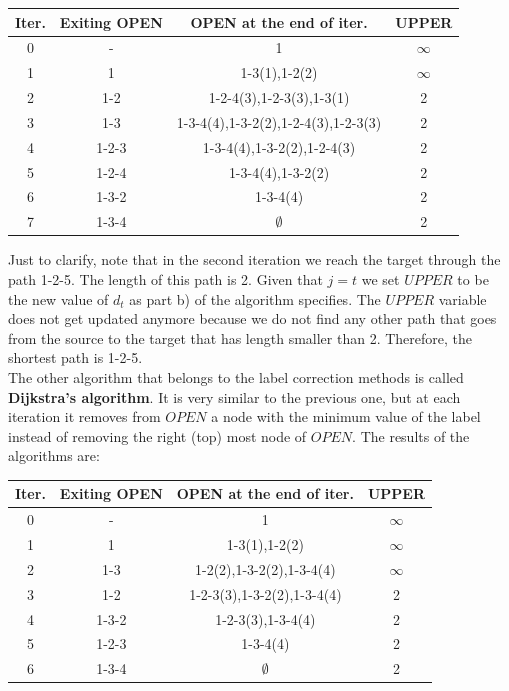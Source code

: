 \documentclass[11pt, oneside]{article}   	%
\begin{document}
\begin{center}
\begin{tabular}{ | c | c | c | c | }
 Iter. & Exiting OPEN & OPEN at the end of iter. & UPPER\\
 \hline
 0 & - & 1 & $\infty$\\
 1 & 1 & 1-3(1),1-2(2) & $\infty$\\
 2 & 1-2 & 1-2-4(3),1-2-3(3),1-3(1) & 2\\
 3 & 1-3 & 1-3-4(4),1-3-2(2),1-2-4(3),1-2-3(3) & 2\\
 4 & 1-2-3 & 1-3-4(4),1-3-2(2),1-2-4(3) & 2\\
 5 & 1-2-4 & 1-3-4(4),1-3-2(2) & 2\\
 6 & 1-3-2 & 1-3-4(4) & 2\\
 7 & 1-3-4 & $\emptyset$ & 2\\
 \end{tabular}
\end{center}

Just to clarify, note that in the second iteration we reach the target through the path 1-2-5. The length of this path is 2. Given that $j=t$ we set $UPPER$ to be the new value of $d_{t}$ as part b) of the algorithm specifies. The $UPPER$ variable does not get updated anymore because we do not find any other path that goes from the source to the target that has length smaller than 2. Therefore, the shortest path is 1-2-5.\\

The other algorithm that belongs to the label correction methods is called \textbf{Dijkstra's algorithm}. It is very similar to the previous one, but at each iteration it removes from $OPEN$ a node with the minimum value of the label instead of removing the right (top) most node of $OPEN$. The results of the algorithms are:

\begin{center}
\begin{tabular}{ | c | c | c | c | }
 Iter. & Exiting OPEN & OPEN at the end of iter. & UPPER\\
 \hline
 0 & - & 1 & $\infty$\\
 1 & 1 & 1-3(1),1-2(2) & $\infty$\\
 2 & 1-3 & 1-2(2),1-3-2(2),1-3-4(4) & $\infty$\\
 3 & 1-2 & 1-2-3(3),1-3-2(2),1-3-4(4) & 2\\
 4 & 1-3-2 & 1-2-3(3),1-3-4(4) & 2\\
 5 & 1-2-3 & 1-3-4(4) & 2\\
 6 & 1-3-4 & $\emptyset$ & 2\\
 \end{tabular}
\end{center}
\end{document}
